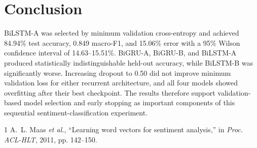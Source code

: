 \documentclass[conference]{IEEEtran}
\begin{document}
\section{Conclusion}
BiLSTM-A was selected by minimum validation cross-entropy and achieved 84.94\% test accuracy, 0.849 macro-F1, and 15.06\% error with a 95\% Wilson confidence interval of 14.63--15.51\%. BiGRU-A, BiGRU-B, and BiLSTM-A produced statistically indistinguishable held-out accuracy, while BiLSTM-B was significantly worse. Increasing dropout to 0.50 did not improve minimum validation loss for either recurrent architecture, and all four models showed overfitting after their best checkpoint. The results therefore support validation-based model selection and early stopping as important components of this sequential sentiment-classification experiment.

\begin{thebibliography}{1}
A.~L. Maas \emph{et al.}, ``Learning word vectors for sentiment analysis,'' in \emph{Proc. ACL-HLT}, 2011, pp. 142--150.
\end{thebibliography}
\end{document}
